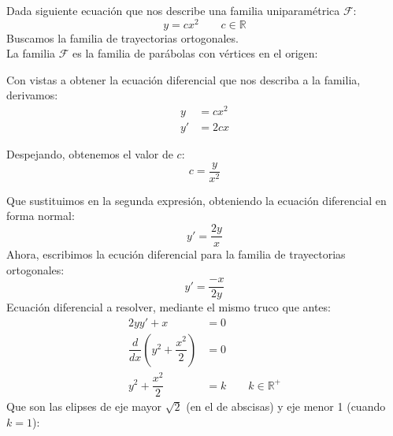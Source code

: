 \begin{ejemplo}
    Dada siguiente ecuación que nos describe una familia uniparamétrica $\mathcal{F}$:
    \begin{equation*}
        y = cx^2 \qquad c\in \mathbb{R}
    \end{equation*}
    Buscamos la familia de trayectorias ortogonales.\\

    La familia $\mathcal{F}$ es la familia de parábolas con vértices en el origen:
    \ifdefined\showimages
    \begin{center}
    \end{center}
    \fi

    Con vistas a obtener la ecuación diferencial que nos describa a la familia, derivamos:
    \begin{align*}
        y &= cx^2 \\
        y' &= 2cx
    \end{align*}

    Despejando, obtenemos el valor de $c$:
    \begin{equation*}
        c = \dfrac{y}{x^2}
    \end{equation*}

    Que sustituimos en la segunda expresión, obteniendo la ecuación diferencial en forma normal:
    \begin{equation*}
        y' = \dfrac{2y}{x}
    \end{equation*}
    Ahora, escribimos la ecución diferencial para la familia de trayectorias ortogonales:
    \begin{equation*}
        y' = \dfrac{-x}{2y}
    \end{equation*}
    Ecuación diferencial a resolver, mediante el mismo truco que antes:
    \begin{align*}
        2yy' + x &= 0 \\
        \dfrac{d}{dx} \left(y^2 + \dfrac{x^2}{2}\right) &= 0 \\
        y^2 + \dfrac{x^2}{2} &= k \qquad k\in \mathbb{R}^+
    \end{align*}
    Que son las elipses de eje mayor $\sqrt{2}$ (en el de abscisas) y eje menor 1 (cuando $k=1$):


\end{ejemplo}
